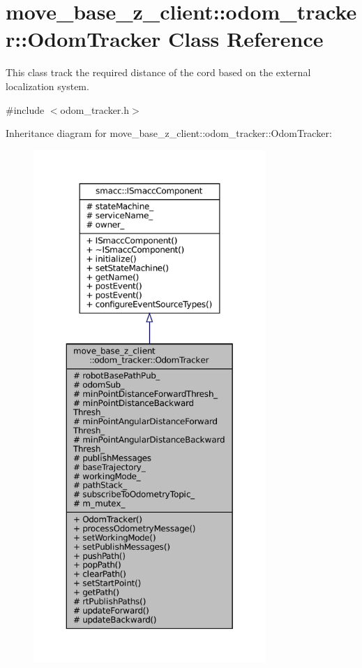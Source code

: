 \hypertarget{classmove__base__z__client_1_1odom__tracker_1_1OdomTracker}{}\section{move\+\_\+base\+\_\+z\+\_\+client\+:\+:odom\+\_\+tracker\+:\+:Odom\+Tracker Class Reference}
\label{classmove__base__z__client_1_1odom__tracker_1_1OdomTracker}


This class track the required distance of the cord based on the external localization system.  




{\ttfamily \#include $<$odom\+\_\+tracker.\+h$>$}



Inheritance diagram for move\+\_\+base\+\_\+z\+\_\+client\+:\+:odom\+\_\+tracker\+:\+:Odom\+Tracker\+:
\nopagebreak
\begin{figure}[H]
\begin{center}
\leavevmode
\includegraphics[height=550pt]{classmove__base__z__client_1_1odom__tracker_1_1OdomTracker__inherit__graph}
\end{center}
\end{figure}


